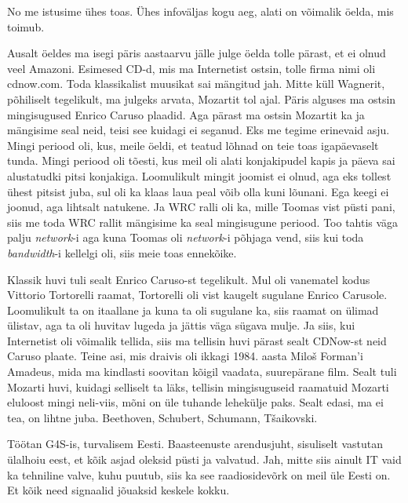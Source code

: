 
No me istusime ühes toas. Ühes infoväljas kogu aeg, alati on võimalik öelda, mis toimub.


Ausalt öeldes ma isegi päris aastaarvu jälle julge öelda tolle pärast, et ei olnud veel Amazoni. Esimesed CD-d, mis ma Internetist ostsin, tolle firma nimi oli cdnow.com. Toda klassikalist muusikat sai mängitud jah. Mitte küll Wagnerit, põhiliselt tegelikult, ma julgeks arvata, Mozartit tol ajal. Päris alguses ma ostsin mingisugused Enrico Caruso plaadid. Aga pärast ma ostsin Mozartit ka ja mängisime seal neid, teisi see kuidagi ei seganud. Eks me tegime erinevaid asju. Mingi periood oli, kus, meile öeldi, et teatud lõhnad on teie toas igapäevaselt tunda. Mingi periood oli tõesti, kus meil oli alati konjakipudel kapis  ja päeva sai alustatudki pitsi konjakiga. Loomulikult mingit joomist ei olnud, aga eks tollest ühest pitsist juba, sul oli ka klaas laua peal võib olla kuni lõunani. Ega keegi ei joonud, aga lihtsalt natukene. Ja WRC ralli oli ka, mille Toomas vist püsti pani, siis me toda WRC rallit mängisime ka seal mingisugune periood. Too tahtis väga palju \emph{network}-i aga kuna Toomas oli \emph{network}-i põhjaga vend, siis kui toda \emph{bandwidth}-i kellelgi oli, siis meie toas ennekõike.


Klassik huvi tuli sealt Enrico Caruso-st tegelikult. Mul oli vanematel kodus Vittorio Tortorelli raamat, Tortorelli  oli vist kaugelt sugulane Enrico Carusole. Loomulikult ta on itaallane ja kuna ta oli sugulane ka, siis raamat on ülimad ülistav, aga ta oli huvitav lugeda ja jättis väga sügava mulje. Ja siis, kui Internetist  oli võimalik tellida, siis ma tellisin huvi pärast sealt CDNow-st neid Caruso plaate. Teine asi, mis draivis oli ikkagi 1984. aasta Miloš Forman'i Amadeus, mida ma kindlasti soovitan kõigil vaadata, suurepärane film. Sealt tuli Mozarti huvi, kuidagi selliselt ta läks,  tellisin mingisuguseid raamatuid Mozarti eluloost mingi neli-viis, mõni on üle tuhande lehekülje paks. Sealt edasi, ma ei tea, on lihtne juba. Beethoven, Schubert, Schumann, Tšaikovski. 


Töötan G4S-is, turvalisem Eesti. Baasteenuste arendusjuht,  sisuliselt  vastutan ülalhoiu eest, et kõik asjad oleksid püsti ja valvatud. Jah, mitte siis ainult IT vaid ka  tehniline valve, kuhu puutub, siis ka see raadiosidevõrk on meil üle Eesti on. Et kõik need signaalid jõuaksid  keskele kokku.
